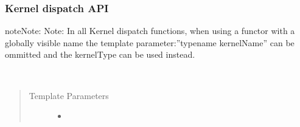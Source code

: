 \documentclass[letterpaper,10pt,english]{sphinxmanual}
\begin{document}
\begin{fulllineitems}
\begin{fulllineitems}
\end{fulllineitems}


\begin{fulllineitems}
\label{\detokenize{programming-interface/parallelism/command-group-handler:_CPPv4IDpEN7handler8set_argsEvDpRR2Ts}}%
\pysigstartmultiline
{}%
\pysigstopmultiline
\end{fulllineitems}

\subsubsection*{Kernel dispatch API}

\begin{sphinxadmonition}{note}{Note:}
Note: In all Kernel dispatch functions,
when using a functor with a globally visible name
the template parameter:”typename kernelName” can be ommitted
and the kernelType can be used instead.
\end{sphinxadmonition}

\begin{fulllineitems}
\label{\detokenize{programming-interface/parallelism/command-group-handler:_CPPv4I00EN7handler11single_taskEv10KernelType}}%
\pysigstartmultiline
{}%
\pysigstopmultiline{}\label{\detokenize{programming-interface/parallelism/command-group-handler:_CPPv4N7handler11single_taskE6kernel}}%
\pysigstartmultiline
{}%
\pysigstopmultiline~\begin{quote}\begin{description}
\item[{Template Parameters}] \leavevmode\begin{itemize}
\item {} 
 \textendash{} 


\end{itemize}
\end{description}
\end{quote}
\end{fulllineitems}
\end{fulllineitems}
\end{document}
